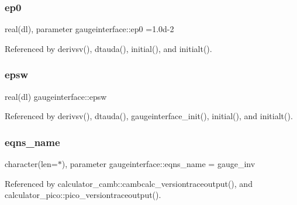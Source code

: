 \mbox{\label{namespacegaugeinterface_ac46c357baba62f4aeaaec10b492d6e80}} 
\subsubsection{\texorpdfstring{ep0}{ep0}}
{\footnotesize\ttfamily real(dl), parameter gaugeinterface\+::ep0 =1.\+0d-\/2}



Referenced by derivsv(), dtauda(), initial(), and initialt().

\mbox{\label{namespacegaugeinterface_a7958da73f55e60b6e679c0a7f70ec822}} 
\subsubsection{\texorpdfstring{epsw}{epsw}}
{\footnotesize\ttfamily real(dl) gaugeinterface\+::epsw}



Referenced by derivsv(), dtauda(), gaugeinterface\+\_\+init(), initial(), and initialt().

\mbox{\label{namespacegaugeinterface_a7ad176ccd8e025b00d5ae35428c6f894}} 
\subsubsection{\texorpdfstring{eqns\+\_\+name}{eqns\_name}}
{\footnotesize\ttfamily character(len=$\ast$), parameter gaugeinterface\+::eqns\+\_\+name = \textquotesingle{}gauge\+\_\+inv\textquotesingle{}}



Referenced by calculator\+\_\+camb\+::cambcalc\+\_\+versiontraceoutput(), and calculator\+\_\+pico\+::pico\+\_\+versiontraceoutput().

\mbox{\label{namespacegaugeinterface_ac5567a8b42e51ba563113652958ea70b}} 

